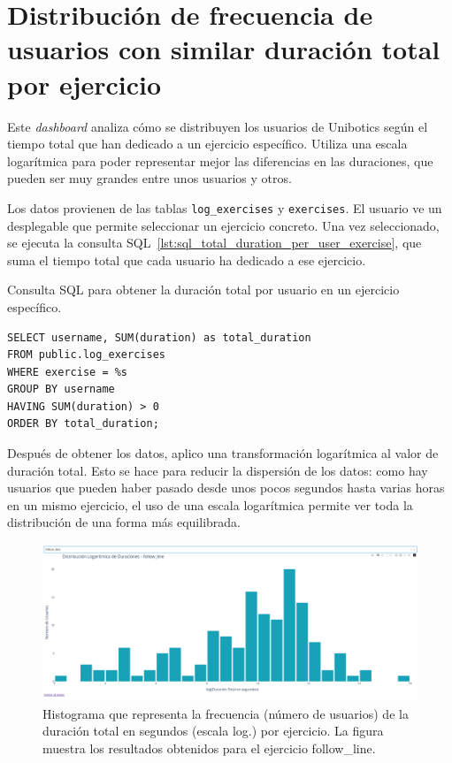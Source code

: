 \documentclass[a4paper, 12pt]{book}
\begin{document}
\section{Distribución de frecuencia de usuarios con similar duración total por ejercicio}
\label{sec:dash3a}

Este \textit{dashboard} analiza cómo se distribuyen los usuarios de Unibotics según el tiempo total que han dedicado a un ejercicio específico. Utiliza una escala logarítmica para poder representar mejor las diferencias en las duraciones, que pueden ser muy grandes entre unos usuarios y otros.

Los datos provienen de las tablas \texttt{log\_exercises} y \texttt{exercises}. El usuario ve un desplegable que permite seleccionar un ejercicio concreto. Una vez seleccionado, se ejecuta la consulta SQL~\ref{lst:sql_total_duration_per_user_exercise}, que suma el tiempo total que cada usuario ha dedicado a ese ejercicio.

\begin{listing}[h!]
\caption{Consulta SQL para obtener la duración total por usuario en un ejercicio específico.}
\label{lst:sql_total_duration_per_user_exercise}
\begin{verbatim}
SELECT username, SUM(duration) as total_duration
FROM public.log_exercises
WHERE exercise = %s
GROUP BY username
HAVING SUM(duration) > 0
ORDER BY total_duration;
\end{verbatim}
\end{listing}

Después de obtener los datos, aplico una transformación logarítmica al valor de duración total. Esto se hace para reducir la dispersión de los datos: como hay usuarios que pueden haber pasado desde unos pocos segundos hasta varias horas en un mismo ejercicio, el uso de una escala logarítmica permite ver toda la distribución de una forma más equilibrada.

\begin{figure}[H]
  \centering
  \includegraphics[width=1.1\textwidth]{img/3a.png}
  \caption{Histograma que representa la frecuencia (número de usuarios) de la duración total en segundos (escala log.) por ejercicio. La figura muestra los resultados obtenidos para el ejercicio follow\_line.}
  \label{fig:3a}
\end{figure}
\end{document}
